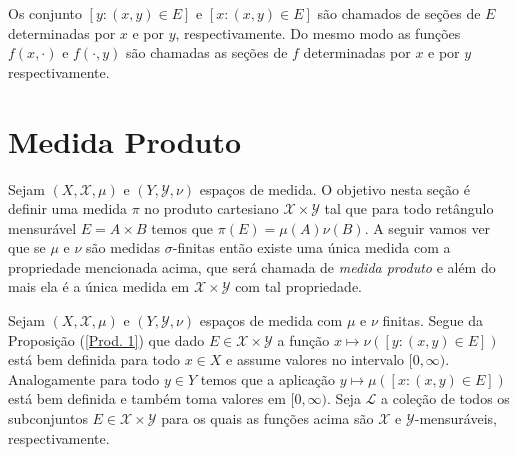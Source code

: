 \begin{observacao}
Os conjunto $[y: (x,y)\in E]$ e $[x: (x,y)\in E]$ 
são chamados de seções de $E$ determinadas por $x$ e 
por $y$, respectivamente. Do mesmo modo as funções $f(x, \cdot)$ e $f(\cdot, y)$ 
são chamadas as seções de $f$ determinadas por $x$ e por $y$ respectivamente.
\end{observacao}



\section{Medida Produto}
Sejam $(X, \mathscr{X}, \mu)$ e $(Y, \mathscr{Y}, \nu)$
espaços de medida. 
O objetivo nesta seção é definir uma medida $\pi$ no produto cartesiano 
$\mathscr{X}\times \mathscr{Y}$ tal que para todo 
retângulo mensurável $E=A\times B$ temos que 
$\pi(E)=\mu(A)\nu(B)$. 
A seguir vamos ver que se 
$ \mu$ e $\nu$ são medidas $\sigma$-finitas então 
existe uma única medida com a propriedade mencionada acima, 
que será chamada de \emph{medida produto} e além do mais 
ela é a única medida em $\mathscr{X}\times\mathscr{Y}$ 
com tal propriedade.
\medskip
 

Sejam $(X, \mathscr{X}, \mu)$ e $(Y, \mathscr{Y}, \nu)$
espaços de medida com $\mu$ e $\nu$ finitas. 
Segue  da Proposição (\ref{Prod. 1}) que dado
$E\in \mathscr{X}\times \mathscr{Y}$ a função 
$x\mapsto \nu([y:(x,y)\in E])$ está bem definida 
para todo $x\in X$ e assume valores no intervalo $[0, \infty)$.
Analogamente para todo $y\in Y$ temos que a 
aplicação $y\mapsto \mu([x:(x,y)\in E])$ 
está bem definida e também toma valores em $[0, \infty)$.
Seja $\mathscr{L}$ a coleção de todos os subconjuntos 
$E\in \mathscr{X}\times \mathscr{Y}$
para os quais as funções acima são $\mathscr{X}$ e $\mathscr{Y}$-mensuráveis,
respectivamente.

